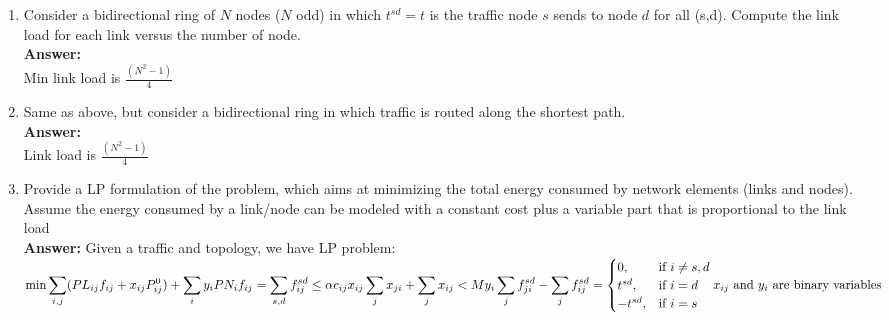 \documentclass[a4paper]{article}
\begin{document}
\begin{enumerate}
\item Consider a bidirectional ring of $N$ nodes ($N$  odd) in which $t^{sd} = t$ is the traffic node $s$ sends to node $d$ for all (s,d). Compute the link load for each link versus the number of node.\\
\textbf{Answer:}\\
Min link load is $\frac{(N^2 - 1)}{4}$
\item Same  as  above,  but  consider  a  bidirectional  ring  in  which  traffic  is  routed along the  shortest  path.\\
\textbf{Answer:}\\
Link load is $\frac{(N^2 - 1)}{4}$
\item Provide a LP formulation of the problem, which aims at minimizing  the total  energy consumed by network elements (links and nodes). Assume the energy  consumed by a link/node  can  be  modeled with a constant cost plus a  variable part that is proportional to the link load\\
\textbf{Answer:} Given a traffic and topology, we have LP problem:\\
\begin{math}
\min{\displaystyle\sum\limits_{i,j} ({PL_{ij}f_{ij} + x_{ij}P_{ij}^0)} + \displaystyle\sum\limits_{i} y_i{PN_{i}}} \\
f_{ij} = \displaystyle\sum\limits_{s,d} {f_{ij}^{sd}} \le \alpha c_{ij}x_{ij} \\
\displaystyle\sum\limits_{j} {x_{ji}} + \displaystyle\sum\limits_{j} {x_{ij}} < My_{i}\\
\displaystyle\sum\limits_{j} {f_{ji}^{sd}} - \displaystyle\sum\limits_{j} {f_{ij}^{sd}} =
  \begin{cases}
  0, &\text{if $i \neq s, d$}\\
  t^{sd}, &\text{if $i = d$}\\
  -t^{sd}, &\text{if $i = s$}
  \end{cases} \\
\text{$x_{ij}$ and $y_i$ are binary variables}
\end{math}


\end{enumerate}
\end{document}

